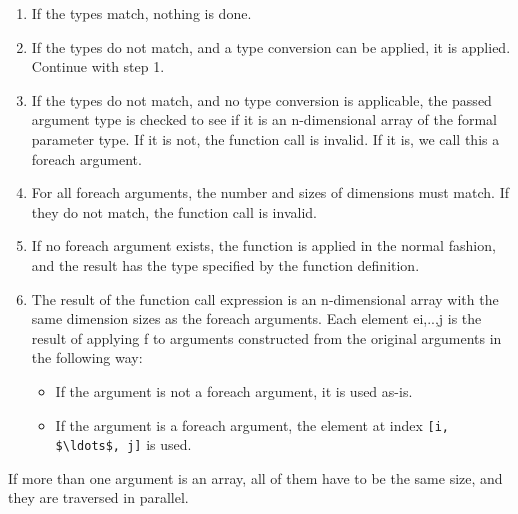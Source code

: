 \begin{enumerate}
\item
  If the types match, nothing is done.
\item
  If the types do not match, and a type conversion can be applied, it is
  applied. Continue with step 1.
\item
  If the types do not match, and no type conversion is applicable, the
  passed argument type is checked to see if it is an n-dimensional array
  of the formal parameter type. If it is not, the function call is
  invalid. If it is, we call this a foreach argument.
\item
  For all foreach arguments, the number and sizes of dimensions must
  match. If they do not match, the function call is invalid.
\item
  If no foreach argument exists, the function is applied in the normal
  fashion, and the result has the type specified by the function
  definition.
\item
  The result of the function call expression is an n-dimensional array
  with the same dimension sizes as the foreach arguments. Each element
  ei,..,j is the result of applying f to arguments constructed from the
  original arguments in the following way:
\begin{itemize}
\item
  If the argument is not a foreach argument, it is used as-is.
\item
  If the argument is a foreach argument, the element at index
  \lstinline[mathescape=true]![i, $\ldots$, j]! is used.
\end{itemize}
\end{enumerate}

If more than one argument is an array, all of them have to be the same
size, and they are traversed in parallel.

